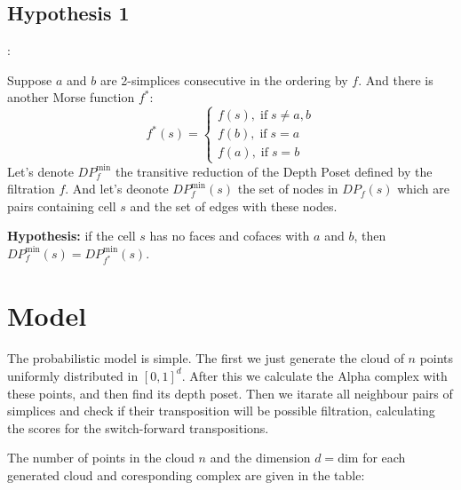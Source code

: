 \documentclass{article}
\begin{document}
\subsection{Hypothesis 1}:
\par Suppose $a$ and $b$ are 2-simplices consecutive in the ordering by $f$. And there is another Morse function $f^*$:
$$
f^*(s) =
\begin{cases}
f(s), \; \text{if} \; s\ne a, b \\
f(b), \; \text{if} \; s = a \\
f(a), \; \text{if} \; s = b
\end{cases}
$$
Let's denote $DP_{f}^\text{min}$ the transitive reduction of the Depth Poset defined by the filtration $f$. And let's deonote $DP_{f}^\text{min}(s)$ the set of nodes in $DP_f(s)$ which are pairs containing cell $s$ and the set of edges with these nodes.

\par \textbf{Hypothesis:} if the cell $s$ has no faces and cofaces with $a$ and $b$, then $DP_f^\text{min}(s) = DP_{f^*}^\text{min}(s)$.


\section{Model}

\par The probabilistic model is simple. The first we just generate the cloud of $n$ points uniformly distributed in $[0, 1]^d$. After this we calculate the Alpha complex with these points, and then find its depth poset. Then we itarate all neighbour pairs of simplices and check if their transposition will be possible filtration, calculating the scores for the switch-forward transpositions.

\par The number of points in the cloud $n$ and the dimension $d = \text{dim}$
for each generated cloud and coresponding complex are given in the table:
\end{document}
